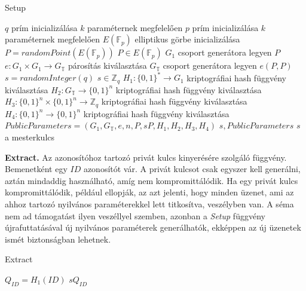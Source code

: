 \begin{outdentlist}
    \begin{algorithm}[H]
        \caption{Setup}
        \label{algorithm:setup}
        \begin{algorithmic}
            \State $q$ prím inicializálása \Comment $k$ paraméternek megfelelően
            \State $p$ prím inicializálása \Comment $k$ paraméternek megfelelően
            \State $E(\mathbb{F}_p)$ elliptikus görbe inicializálása
            \State $P = randomPoint(E(\mathbb{F}_p))$ \Comment $P \in E(\mathbb{F}_p)$
            \State $G_1$ csoport generátora legyen $P$
            \State $e : G_1 \times G_1 \rightarrow G_\mathbb{T}$ párosítás kiválasztása
            \State $G_\mathbb{T}$ csoport generátora legyen $e(P, P)$
            \State $s = randomInteger(q)$ \Comment $s \in \mathbb{Z}_q$
            \State $H_1 : \{0, 1\}^* \rightarrow G_1$ kriptográfiai hash függvény kiválasztása
            \State $H_2 : G_\mathbb{T} \rightarrow \{0, 1\}^n$ kriptográfiai hash függvény kiválasztása
            \State $H_3 : \{0, 1\}^n \times \{0, 1\}^n \rightarrow \mathbb{Z}_q$ kriptográfiai hash függvény kiválasztása
            \State $H_4 : \{0, 1\}^n \rightarrow \{0, 1\}^n$ kriptográfiai hash függvény kiválasztása
            \State $PublicParameters = (G_1, G_\mathbb{T}, e, n, P, sP, H_1, H_2, H_3, H_4)$
            \State \Return $s, PublicParameters$ \Comment $s$ a mesterkulcs
            \EndProcedure
        \end{algorithmic}
    \end{algorithm}

    \item[]\textbf{Extract.}
    Az azonosítóhoz tartozó privát kulcs kinyerésére szolgáló függvény. Bemenetként egy $ID$ azonosítót vár. A privát kulcsot csak egyszer kell generálni, aztán mindaddig használható, amíg nem kompromittálódik. Ha egy privát kulcs kompromittálódik, például ellopják, az azt jelenti, hogy minden üzenet, ami az ahhoz tartozó nyilvános paraméterekkel lett titkosítva, veszélyben van. A séma nem ad támogatást ilyen veszéllyel szemben, azonban a \textit{Setup} függvény újrafuttatásával új nyilvános paraméterek generálhatók, ekképpen az új üzenetek ismét biztonságban lehetnek.
    \begin{algorithm}[H]
        \caption{Extract}
        \label{algorithm:extract}
        \begin{algorithmic}
            \State $Q_{ID} = H_1(ID)$
            \State \Return $sQ_{ID}$
            \EndProcedure
        \end{algorithmic}
    \end{algorithm}


\end{outdentlist}
